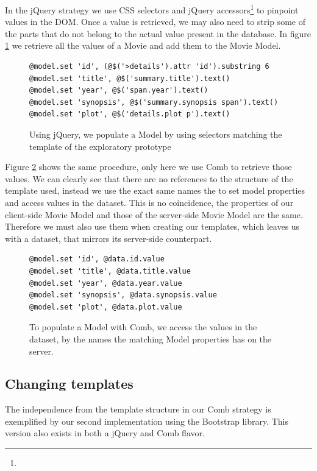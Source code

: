 \documentclass[thesis.tex]{subfiles}
\begin{document}
In the jQuery strategy we use CSS selectors and jQuery
accessors\footnote{} to pinpoint values in the
DOM.
Once a value is retrieved, we may also need to strip some of the parts that do
not belong to the actual value present in the database.
In figure \ref{fig:movie-jquery-prototype} we retrieve all the
values of a Movie and add them to the Movie Model.
\begin{figure}
	\centering
	\begin{lstlisting}
@model.set 'id', (@$('>details').attr 'id').substring 6
@model.set 'title', @$('summary.title').text()
@model.set 'year', @$('span.year').text()
@model.set 'synopsis', @$('summary.synopsis span').text()
@model.set 'plot', @$('details.plot p').text()
	\end{lstlisting}
	\caption{Using jQuery, we populate a Model by using selectors matching the
	template of the exploratory prototype}
	\label{fig:movie-jquery-prototype}
\end{figure}

Figure \ref{fig:movie-comb-prototype} shows the same procedure, only here we
use Comb to retrieve those values. We can clearly see that there are no
references to the structure of the template used, instead we use the exact same
names the to set model properties and access values in the dataset.
This is no coincidence, the properties of our client-side Movie Model and
those of the server-side Movie Model are the same. Therefore we must also use
them when creating our templates, which leaves us with a dataset, that mirrors
its server-side counterpart.
\begin{figure}
	\centering
	\begin{lstlisting}
@model.set 'id', @data.id.value
@model.set 'title', @data.title.value
@model.set 'year', @data.year.value
@model.set 'synopsis', @data.synopsis.value
@model.set 'plot', @data.plot.value
	\end{lstlisting}
	\caption{To populate a Model with Comb, we access the values in the dataset,
	by the names the matching Model properties has on the server.}
	\label{fig:movie-comb-prototype}
\end{figure}

\subsection{Changing templates}
\label{sec:changing-templates}
The independence from the template structure in our Comb strategy is exemplified
by our second implementation using the Bootstrap library. This version also
exists in both a jQuery and Comb flavor.
\end{document}
